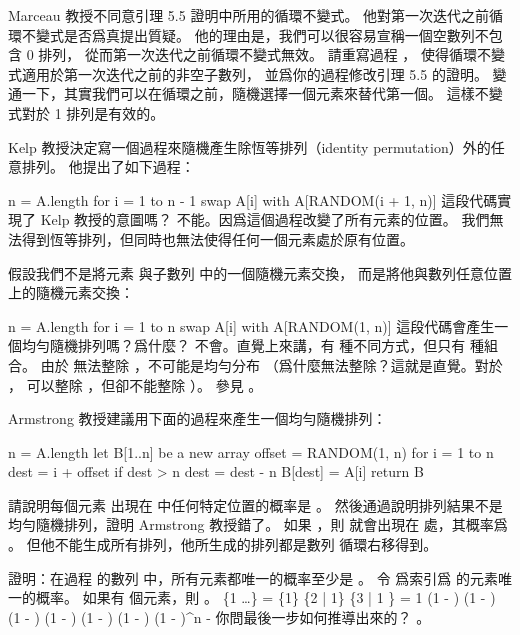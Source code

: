 \startsection[
  title={Randomized algorithms},
]

\startEXERCISE
Marceau 教授不同意引理 5.5 證明中所用的循環不變式。
他對第一次迭代之前循環不變式是否爲真提出質疑。
他的理由是，我們可以很容易宣稱一個空數列不包含 0 排列，
從而第一次迭代之前循環不變式無效。
請重寫過程 ，
使得循環不變式適用於第一次迭代之前的非空子數列，
並爲你的過程修改引理 5.5 的證明。
\stopEXERCISE
\startANSWER
變通一下，其實我們可以在循環之前，隨機選擇一個元素來替代第一個。
這樣不變式對於 1 排列是有效的。
\stopANSWER

\startEXERCISE
Kelp 教授決定寫一個過程來隨機產生除恆等排列（identity permutation）外的任意排列。
他提出了如下過程：

\startCLRS
n = A.length
for i = 1 to n - 1
	swap A[i] with A[RANDOM(i + 1, n)]
\stopCLRS
這段代碼實現了 Kelp 教授的意圖嗎？
\stopEXERCISE
\startANSWER
不能。因爲這個過程改變了所有元素的位置。
我們無法得到恆等排列，但同時也無法使得任何一個元素處於原有位置。
\stopANSWER

\startEXERCISE
假設我們不是將元素  與子數列  中的一個隨機元素交換，
而是將他與數列任意位置上的隨機元素交換：

\startCLRS
n = A.length
for i = 1 to n
	swap A[i] with A[RANDOM(1, n)]
\stopCLRS
這段代碼會產生一個均勻隨機排列嗎？爲什麼？
\stopEXERCISE
\startANSWER
不會。直覺上來講，有  種不同方式，但只有  種組合。
由於  無法整除 ，不可能是均勻分布
（爲什麼無法整除？這就是直覺。對於 ，  可以整除 ，但卻不能整除 ）。
參見 。
\stopANSWER

\startEXERCISE
Armstrong 教授建議用下面的過程來產生一個均勻隨機排列：

\startCLRS
n = A.length
let B[1..n] be a new array
offset = RANDOM(1, n)
for i = 1 to n
	dest = i + offset
	if dest > n
		dest = dest - n
	B[dest] = A[i]
return B
\stopCLRS

請說明每個元素  出現在  中任何特定位置的概率是 。
然後通過說明排列結果不是均勻隨機排列，證明 Armstrong 教授錯了。
\stopEXERCISE
\startANSWER
如果 ，則  就會出現在  處，其概率爲 。
但他不能生成所有排列，他所生成的排列都是數列  循環右移得到。
\stopANSWER

\startEXERCISE \DIFFICULT
證明：在過程  的數列  中，所有元素都唯一的概率至少是 。
\stopEXERCISE
\startANSWER
令  爲索引爲  的元素唯一的概率。
如果有  個元素，則 。
\startformula\startmathalignment
\NC \Pr\{1   \cap \ldots\}
       \NC= \Pr\{1\} \cdot \Pr\{2 | 1\} \cdot \Pr\{3 | 1 \} \cdots \NR
\NC    \NC= 1 (1 - )
            (1 - )
            (1 - )
            \cdots \NR
\NC    \NC{} (1 - )
            (1 - )
            (1 - )
            \cdots \NR
\NC    \NC\ge (1 - )^n \NR
\NC    \NC{} -  \NR
\stopmathalignment\stopformula
你問最後一步如何推導出來的？ 。
\stopANSWER

